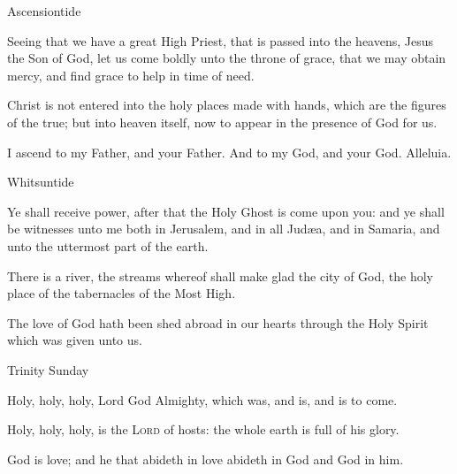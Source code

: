\begin{multicols}{2}
\centerline{\color{RubricRed}\small%
Ascensiontide}
\par\noindent
    Seeing that we have a great High Priest, that is passed into the heavens, Jesus the Son of God, let us come boldly unto the throne of grace, that we may obtain mercy, and find grace to help in time of need.\par
    
    Christ is not entered into the holy places made with hands, which are the figures of the true; but into heaven itself, now to appear in the presence of God for us.\par

    I ascend to my Father, and your Father. And to my God, and your God. Alleluia.\\

\centerline{\color{RubricRed}\small%
Whitsuntide}
\par\noindent
    Ye shall receive power, after that the Holy Ghost is come upon you: and ye shall be witnesses unto me both in Jerusalem, and in all Jud{\ae}a, and in Samaria, and unto the uttermost part of the earth.\par
    
    There is a river, the streams whereof shall make glad the city of God, the holy place of the tabernacles of the Most High.\par

    The love of God hath been shed abroad in our hearts through the Holy Spirit which was given unto us.\\

\centerline{\color{RubricRed}\small%
Trinity Sunday}
\par\noindent
    Holy, holy, holy, Lord God Almighty, which was, and is, and is to come.
    \par
    Holy, holy, holy, is the \textsc{Lord} of hosts: the whole earth is full of his glory. 
    \par
    God is love; and he that abideth in love abideth in God and God in him.\\


\end{multicols}
